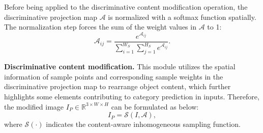 \documentclass[letterpaper]{article} %
\begin{document}
Before being applied to the discriminative content modification operation, the discriminative projection map $ \mathcal{A} $ is normalized with a softmax function spatially. The normalization step forces the sum of the weight values in $ \mathcal{A} $ to 1:
\begin{equation}
 \mathcal{A}_{ij}= \frac{e^{\mathcal{A}_{ij}}}{\sum_{i=1}^{W_S}\sum_{j=1}^{H_S}e^{\mathcal{A}_{ij}}}.
\end{equation} 

\textbf{Discriminative content modification.}
This module utilizes the spatial information of sample points and corresponding sample weights in the discriminative projection map to rearrange object content, which further highlights some elements contributing to category prediction in inputs. Therefore, the modified image $ I_P \in\mathbb{R}^{3\times W \times H} $ can be formulated as below:
\begin{equation}
I_P = \mathcal{S}(I, \mathcal{A}),
\end{equation}
where $ \mathcal{S}(\cdot) $ indicates the content-aware inhomogeneous sampling function. 
\end{document}
